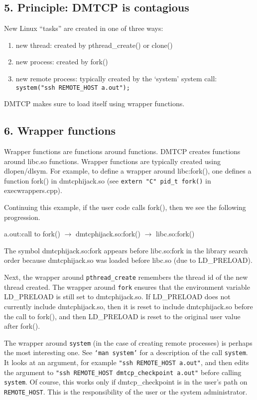 \documentclass{article}
\begin{document}
\newpage

\subsection*{5. Principle:  DMTCP is contagious}

New Linux ``tasks'' are created in one of three ways:
\begin{enumerate}
  \item new thread: created by pthread\_create() or clone()
  \item new process: created by fork()
  \item new remote process: typically created by the `system' system call: \\
	{\tt system("ssh REMOTE\_HOST a.out");}
\end{enumerate}

DMTCP makes sure to load itself using wrapper functions.

\subsection*{6. Wrapper functions}

Wrapper functions are functions around functions.  DMTCP creates
functions around libc.so functions.
Wrapper functions
are typically created using dlopen/dlsym.  For example, to define
a wrapper around libc:fork(), one defines a function fork()
in dmtcphijack.so (see {\tt extern "C" pid\_t fork()} in execwrappers.cpp).

Continuing this example, if the user code calls fork(), then we see
the following progression.

a.out:call to fork() $\longrightarrow$ dmtcphijack.so:fork() $\longrightarrow$ libc.so:fork()

The symbol dmtcphijack.so:fork appears before libc.so:fork in the
library search order because dmtcphijack.so was loaded before libc.so
(due to LD\_PRELOAD).

Next, the wrapper around {\tt pthread\_create} remembers the thread id
of the new thread created.  The wrapper around {\tt fork} ensures
that the environment variable LD\_PRELOAD is still set to dmtcphijack.so.
If LD\_PRELOAD does not currently include dmtcphijack.so, then it is
reset to include dmtcphijack.so before the call to fork(), and then
LD\_PRELOAD is reset to the original user value after fork().

The wrapper around {\tt system} (in the case of creating remote processes)
is perhaps the most interesting one.  See {\tt `man system'} for a description
of the call {\tt system}.  It looks at an argument, for example
{\tt "ssh REMOTE\_HOST a.out"}, and then edits the argument to
{\tt "ssh REMOTE\_HOST dmtcp\_checkpoint a.out"} before calling {\tt system}.
Of course, this works only if dmtcp\_checkpoint is in the user's path
on {\tt REMOTE\_HOST}.  This is the responsibility of the user or the
system administrator.
\end{document}

